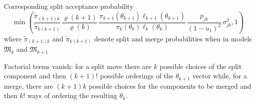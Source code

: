 \begin{slide}
\end{slide}\begin{slide}

Corresponding split acceptance probability
\small$$
\min\left(\frac{\widetilde\pi_{(k+1)k}}{\widetilde\pi_{k(k+1)} }\,\frac{\varrho(k+1)}{\varrho(k)}\,
\frac{\pi_{k+1}(\theta_{k+1})\ell_{k+1}(\theta_{k+1})}{\pi_{k}(\theta_{k})\ell_{k}
(\theta_{k})}\,\frac{p_{jk}}{(1-u_1)^2}\,\sigma_{jk}^2,1 \right)
$$\normalsize
where $\widetilde\pi_{(k+1)k}$ and $\widetilde\pi_{k(k+1)}$ denote split and merge probabilities
when in models $\mathfrak{M}_k$ and $\mathfrak{M}_{k+1}$

\vs\pause\small
Factorial terms vanish: for a split move there are $k$ possible choices
of the split component and then $(k+1)!$ possible orderings of the $\theta_{k+1}$ vector \pause
while, for a merge, there are $(k+1)k$ possible choices for the components to be merged
and then $k!$ ways of ordering the resulting $\theta_k$.\normalsize

\end{slide}

